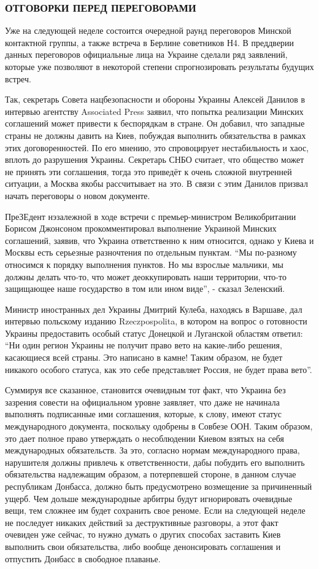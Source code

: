 \subsubsection{ОТГОВОРКИ ПЕРЕД ПЕРЕГОВОРАМИ}

Уже на следующей неделе состоится очередной раунд переговоров Минской
контактной группы, а также встреча в Берлине советников Н4. В преддверии данных
переговоров официальные лица на Украине сделали ряд заявлений, которые уже
позволяют в некоторой степени спрогнозировать результаты будущих встреч. 

Так, секретарь Совета нацбезопасности и обороны Украины Алексей Данилов в
интервью агентству Associated Press заявил, что попытка реализации Минских
соглашений может привести к беспорядкам в стране. Он добавил, что западные
страны не должны давить на Киев, побуждая выполнить обязательства в рамках этих
договоренностей. По его мнению, это спровоцирует нестабильность и хаос, вплоть
до разрушения Украины. Секретарь СНБО считает, что общество может не принять
эти соглашения, тогда это приведёт к очень сложной внутренней ситуации, а
Москва якобы рассчитывает на это. В связи с этим Данилов призвал начать
переговоры о новом документе.

ПреЗЕдент нэзалежной в ходе встречи с премьер-министром Великобритании Борисом
Джонсоном прокомментировал выполнение Украиной Минских соглашений, заявив, что
Украина ответственно к ним относится, однако у Киева и Москвы есть серьезные
разночтения по отдельным пунктам. \enquote{Мы по-разному относимся к порядку выполнения
пунктов. Но мы взрослые мальчики, мы должны делать что-то, что может
деоккупировать наши территории, что-то защищающее наше государство в том или
ином виде}, - сказал Зеленский.

Министр иностранных дел Украины Дмитрий Кулеба, находясь в Варшаве, дал
интервью польскому изданию Rzeczpospolita, в котором на вопрос о готовности
Украины предоставить особый статус Донецкой и Луганской областям ответил: \enquote{Ни
один регион Украины не получит право вето на какие-либо решения, касающиеся
всей страны. Это написано в камне! Таким образом, не будет никакого особого
статуса, как это себе представляет Россия, не будет права вето}.

Суммируя все сказанное, становится очевидным тот факт, что Украина без зазрения
совести на официальном уровне заявляет, что даже не начинала выполнять
подписанные ими соглашения, которые, к слову, имеют статус международного
документа, поскольку одобрены в Совбезе ООН. Таким образом, это дает полное
право утверждать о несоблюдении Киевом взятых на себя международных
обязательств. За это, согласно нормам международного права, нарушителя должны
привлечь к ответственности, дабы побудить его выполнить обязательства
надлежащим образом, а потерпевшей стороне, в данном случае республикам
Донбасса, должно быть предусмотрено возмещение за причиненный ущерб. Чем дольше
международные арбитры будут игнорировать очевидные вещи, тем сложнее им будет
сохранить свое реноме. Если на следующей неделе не последует никаких действий
за деструктивные разговоры, а этот факт очевиден уже сейчас, то нужно думать о
других способах заставить Киев выполнить свои обязательства, либо вообще
денонсировать соглашения и отпустить Донбасс в свободное плаванье.

